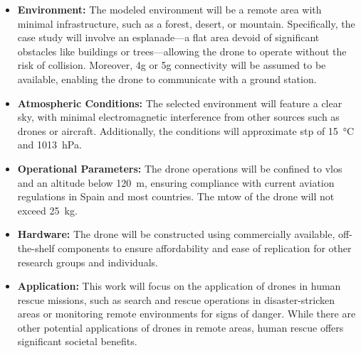 \begin{itemize}
  \item \textbf{Environment:} The modeled environment will be a remote area with minimal infrastructure, such as a forest, desert, or mountain. Specifically, the case study will involve an esplanade—a flat area devoid of significant obstacles like buildings or trees—allowing the drone to operate without the risk of collision. Moreover, \gls{4g} or \gls{5g} connectivity will be assumed to be available, enabling the drone to communicate with a ground station.

  \item \textbf{Atmospheric Conditions:} The selected environment will feature a clear sky, with minimal electromagnetic interference from other sources such as drones or aircraft. Additionally, the conditions will approximate \gls{stp} of \SI{15}{\degreeCelsius} and \SI{1013}{\hecto\pascal}.

  \item \textbf{Operational Parameters:} The drone operations will be confined to \gls{vlos} and an altitude below \SI{120}{\metre}, ensuring compliance with current aviation regulations in Spain and most countries. The \gls{mtow} of the drone will not exceed \SI{25}{\kilogram}.

  \item \textbf{Hardware:} The drone will be constructed using commercially available, off-the-shelf components to ensure affordability and ease of replication for other research groups and individuals.

  \item \textbf{Application:} This work will focus on the application of drones in human rescue missions, such as search and rescue operations in disaster-stricken areas or monitoring remote environments for signs of danger. While there are other potential applications of drones in remote areas, human rescue offers significant societal benefits.
\end{itemize}

